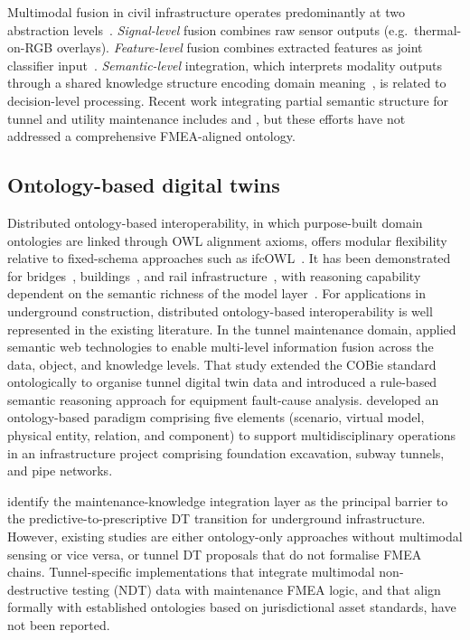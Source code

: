 \documentclass[11pt,a4paper]{article}
\begin{document}
Multimodal fusion in civil infrastructure operates predominantly at two abstraction levels~\citep{Hall1997}. \emph{Signal-level} fusion combines raw sensor outputs (e.g.\ thermal-on-RGB overlays). \emph{Feature-level} fusion combines extracted features as joint classifier input~\citep{Naddaf2025,Hakimi2025,Kang2026}. \emph{Semantic-level} integration, which interprets modality outputs through a shared knowledge structure encoding domain meaning~\citep{Wu2014}, is related to decision-level processing. Recent work integrating partial semantic structure for tunnel and utility maintenance includes \citet{Yu2023} and \citet{Wang2021}, but these efforts have not addressed a comprehensive FMEA-aligned ontology.

\subsection{Ontology-based digital twins}

Distributed ontology-based interoperability, in which purpose-built domain ontologies are linked through OWL alignment axioms, offers modular flexibility relative to fixed-schema approaches such as ifcOWL~\citep{Pauwels2015,Theiler2018,Bonduel2019,Rasmussen2020}. It has been demonstrated for bridges~\citep{Ren2019}, buildings~\citep{Mahdavi2017}, and rail infrastructure~\citep{Li2022}, with reasoning capability dependent on the semantic richness of the model layer~\citep{Tao2019}. For applications in underground construction, distributed ontology-based interoperability is well represented in the existing literature. In the tunnel maintenance domain, \citet{Yu2021} applied semantic web technologies to enable multi-level information fusion across the data, object, and knowledge levels. That study extended the COBie standard ontologically to organise tunnel digital twin data and introduced a rule-based semantic reasoning approach for equipment fault-cause analysis. \citet{Li2024} developed an ontology-based paradigm comprising five elements (scenario, virtual model, physical entity, relation, and component) to support multidisciplinary operations in an infrastructure project comprising foundation excavation, subway tunnels, and pipe networks.

\citet{Zhu2025} identify the maintenance-knowledge integration layer as the principal barrier to the predictive-to-prescriptive DT transition for underground infrastructure. However, existing studies are either ontology-only approaches without multimodal sensing or vice versa, or tunnel DT proposals that do not formalise FMEA chains. Tunnel-specific implementations that integrate multimodal non-destructive testing (NDT) data with maintenance FMEA logic, and that align formally with established ontologies based on jurisdictional asset standards, have not been reported.
\end{document}
